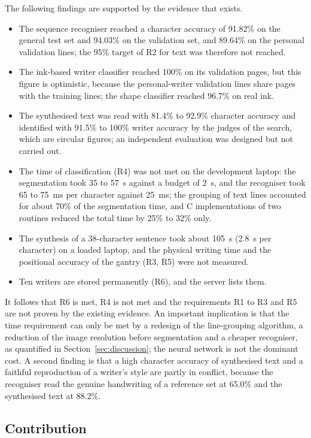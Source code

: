 The following findings are supported by the evidence that exists.
\begin{itemize}
  \item The sequence recogniser reached a character accuracy of 91.82\% on the general test set and 94.03\% on the validation set, and 89.64\% on the personal validation lines; the 95\% target of R2 for text was therefore not reached.
  \item The ink-based writer classifier reached 100\% on its validation pages, but this figure is optimistic, because the personal-writer validation lines share pages with the training lines; the shape classifier reached 96.7\% on real ink.
  \item The synthesised text was read with 81.4\% to 92.9\% character accuracy and identified with 91.5\% to 100\% writer accuracy by the judges of the search, which are circular figures; an independent evaluation was designed but not carried out.
  \item The time of classification (R4) was not met on the development laptop: the segmentation took 35 to 57~s against a budget of 2~s, and the recogniser took 65 to 75~ms per character against 25~ms; the grouping of text lines accounted for about 70\% of the segmentation time, and C implementations of two routines reduced the total time by 25\% to 32\% only.
  \item The synthesis of a 38-character sentence took about 105~s (2.8~s per character) on a loaded laptop, and the physical writing time and the positional accuracy of the gantry (R3, R5) were not measured.
  \item Ten writers are stored permanently (R6), and the server lists them.
\end{itemize}
It follows that R6 is met, R4 is not met and the requirements R1 to R3 and R5 are not proven by the existing evidence.
An important implication is that the time requirement can only be met by a redesign of the line-grouping algorithm, a reduction of the image resolution before segmentation and a cheaper recogniser, as quantified in Section~\ref{sec:discussion}; the neural network is not the dominant cost.
A second finding is that a high character accuracy of synthesised text and a faithful reproduction of a writer's style are partly in conflict, because the recogniser read the genuine handwriting of a reference set at 65.0\% and the synthesised text at 88.2\%.

\subsection{Contribution}
\label{sec:con-contribution}

